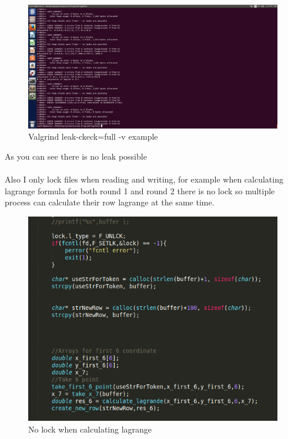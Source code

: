 \documentclass{article}
\begin{document}
\begin{figure}[h!]
\centering
\includegraphics[scale=0.2]{valgrind.png}
\caption{Valgrind leak-ckeck=full -v example}
\label{fig:valgrind.png}
\end{figure}

As you can see there is no leak possible 
\\
\\
Also I only lock files when reading and writing, for example when calculating lagrange formula for both round 1 and round 2 there is no lock so multiple process can calculate their row lagrange at the same time.
\begin{figure}[h!]
\centering
\includegraphics[scale=0.35]{ss8.png}
\caption{No lock when calculating lagrange}
\label{fig:ss8.png}
\end{figure}
\end{document}
